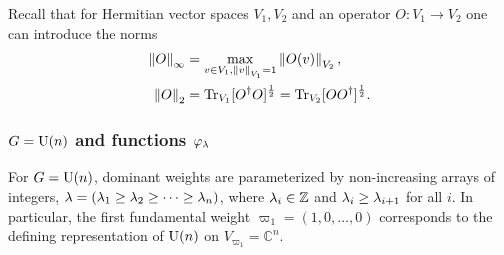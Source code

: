 \documentclass[notitlepage, 11pt, letterpaper]{amsart}
\begin{document}

Recall that for Hermitian vector spaces $V_{1}, V_{2}$ and an operator $O: V_{1} \to V_{2}$ one can introduce the norms
\begin{align}
    \begin{split}
        \left\lVert O\right\rVert_{\infty} &= \max_{v \in V_1, \left\lVert v\right\rVert_{V_1} = 1} \left\lVert O(v)\right\rVert_{V_2}, \\
        \left\lVert O\right\rVert_{2} &= \operatorname{Tr}_{V_1}[O^{\dagger} O]^{\frac{1}{2}} = \operatorname{Tr}_{V_2}[O O^{\dagger}]^{\frac{1}{2}}.
    \end{split}
\end{align}
\subsubsection{\texorpdfstring{$G=\operatorname{U}(n)$}{G=U(n)} and  functions \texorpdfstring{$\varphi_\lambda$}{philambda}}

For $G=\operatorname{U}(n)$, dominant weights are parameterized by non-increasing arrays of integers, $\lambda=(\lambda_1 \geq \lambda_2 \geq \cdots \geq \lambda_n)$, where $\lambda_i \in \mathbb Z$ and $\lambda_i \geq \lambda_{i+1}$ for all $i$.
In particular, the first fundamental weight $\varpi_1=(1, 0, \ldots, 0)$ corresponds to the defining representation of $\operatorname{U}(n)$ on $V_{\varpi_1} = \mathbb{C}^n$.
\end{document}
